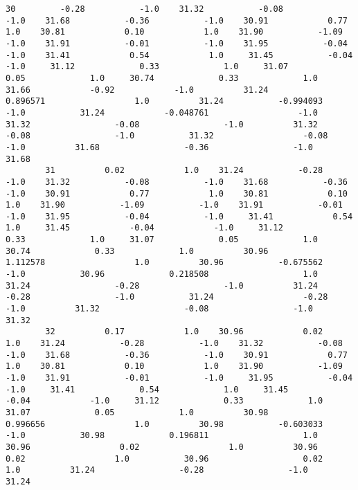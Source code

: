 \documentclass[11pt]{article}
\begin{document}
\begin{Verbatim}[commandchars=\\\{\}]
        30         -0.28           -1.0    31.32           -0.08           -1.0    31.68           -0.36           -1.0    30.91            0.77            1.0    30.81            0.10            1.0    31.90           -1.09           -1.0    31.91           -0.01           -1.0    31.95           -0.04           -1.0    31.41            0.54            1.0     31.45           -0.04            -1.0     31.12             0.33             1.0     31.07             0.05             1.0     30.74             0.33             1.0     31.66            -0.92            -1.0          31.24            0.896571                  1.0          31.24           -0.994093                 -1.0           31.24            -0.048761                  -1.0          31.32                 -0.08                 -1.0          31.32                 -0.08                 -1.0           31.32                  -0.08                  -1.0          31.68                 -0.36                 -1.0          31.68   
        31          0.02            1.0    31.24           -0.28           -1.0    31.32           -0.08           -1.0    31.68           -0.36           -1.0    30.91            0.77            1.0    30.81            0.10            1.0    31.90           -1.09           -1.0    31.91           -0.01           -1.0    31.95           -0.04           -1.0     31.41            0.54             1.0     31.45            -0.04            -1.0     31.12             0.33             1.0     31.07             0.05             1.0     30.74             0.33             1.0          30.96            1.112578                  1.0          30.96           -0.675562                 -1.0           30.96             0.218508                   1.0          31.24                 -0.28                 -1.0          31.24                 -0.28                 -1.0           31.24                  -0.28                  -1.0          31.32                 -0.08                 -1.0          31.32   
        32          0.17            1.0    30.96            0.02            1.0    31.24           -0.28           -1.0    31.32           -0.08           -1.0    31.68           -0.36           -1.0    30.91            0.77            1.0    30.81            0.10            1.0    31.90           -1.09           -1.0    31.91           -0.01           -1.0     31.95           -0.04            -1.0     31.41             0.54             1.0     31.45            -0.04            -1.0     31.12             0.33             1.0     31.07             0.05             1.0          30.98            0.996656                  1.0          30.98           -0.603033                 -1.0           30.98             0.196811                   1.0          30.96                  0.02                  1.0          30.96                  0.02                  1.0           30.96                   0.02                   1.0          31.24                 -0.28                 -1.0          31.24   

\end{Verbatim}
\end{document}
